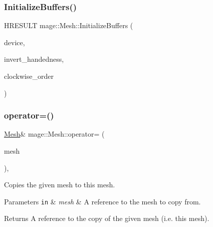 \hypertarget{classmage_1_1_mesh_af7f1ad857f340015630655ab9d34747c}{}\label{classmage_1_1_mesh_af7f1ad857f340015630655ab9d34747c} 
\subsubsection{\texorpdfstring{Initialize\+Buffers()}{InitializeBuffers()}}
{\footnotesize\ttfamily H\+R\+E\+S\+U\+LT mage\+::\+Mesh\+::\+Initialize\+Buffers (\begin{DoxyParamCaption}\item[{\hyperlink{namespacemage_ae74f374780900893caa5555d1031fd79}{Com\+Ptr}$<$ I\+D3\+D11\+Device2 $>$}]{device,  }\item[{bool}]{invert\+\_\+handedness,  }\item[{bool}]{clockwise\+\_\+order }\end{DoxyParamCaption})\hspace{0.3cm}{\ttfamily [protected]}}

\hypertarget{classmage_1_1_mesh_a5baf961af32b379671a59a082492bc5e}{}\label{classmage_1_1_mesh_a5baf961af32b379671a59a082492bc5e} 
\subsubsection{\texorpdfstring{operator=()}{operator=()}}
{\footnotesize\ttfamily \hyperlink{classmage_1_1_mesh}{Mesh}\& mage\+::\+Mesh\+::operator= (\begin{DoxyParamCaption}\item[{const \hyperlink{classmage_1_1_mesh}{Mesh} \&}]{mesh }\end{DoxyParamCaption})\hspace{0.3cm}{\ttfamily [private]}, {\ttfamily [delete]}}

Copies the given mesh to this mesh.


\begin{DoxyParams}[1]{Parameters}
\mbox{\tt in}  & {\em mesh} & A reference to the mesh to copy from. \\
\hline
\end{DoxyParams}
\begin{DoxyReturn}{Returns}
A reference to the copy of the given mesh (i.\+e. this mesh). 
\end{DoxyReturn}
\hypertarget{classmage_1_1_mesh_a61d3baa68f8cc60f3d260e6ecefc126a}{}\label{classmage_1_1_mesh_a61d3baa68f8cc60f3d260e6ecefc126a} 
